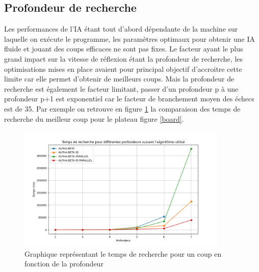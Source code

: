 \documentclass{article}
\begin{document}
\subsection{Profondeur de recherche}

Les performances de l'IA étant tout d'abord dépendante de la machine sur laquelle on exécute le programme, les paramètres optimaux pour obtenir une IA fluide et jouant des coups efficaces 
ne sont pas fixes. Le facteur ayant le plus grand impact sur la vitesse de réflexion étant la profondeur de recherche, les optimisations mises en place avaient pour principal objectif d'accroitre
cette limite car elle permet d'obtenir de meilleurs coups. Mais la profondeur de recherche est également le facteur limitant, passer d'un profondeur p à une profondeur p+1 est exponentiel car le facteur
de branchement moyen des échecs est de 35. Par exemple on retrouve en figure \ref{plot} la comparaison des temps de recherche du meilleur coup pour le plateau figure \ref{board}.

\begin{figure}[h]
    \centering
    \includegraphics[width=\textwidth,height=6.0cm,keepaspectratio]{plot_depth.png}
    \caption{Graphique représentant le temps de recherche pour un coup en fonction de la profondeur}
    \label{plot}
\end{figure}
\end{document}
